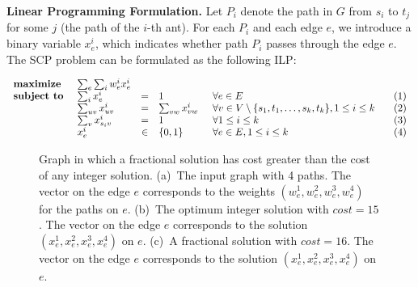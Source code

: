\documentclass[runningheads]{llncs}
\newcommand{\SCoP}{\textsc{SCP}}
\begin{document}
{\bf Linear Programming Formulation.}
Let $P_i$ denote the path in $G$ from $s_i$ to $t_j$ for some $j$ (the
path of the $i$-th ant).
For each $P_i$ and each edge $e$, we introduce a binary variable
$x_e^i$, which indicates whether
path $P_i$ passes through the edge $e$. The \SCoP{} problem can be
formulated as the following ILP:

$$
\begin{array}{llcllr}
\mbox{\textbf{maximize}}\:\: & \sum_e \sum_i w_e^i x_e^i \\
\mbox{\textbf{subject to }} & \sum_i x_e^i        &=&  1  & \forall
e\in E & \:\:\:\:(1)\\
& \sum_{uv} x_{uv}^i  &=&  \sum_{vw} x_{vw}^i \:\:& \forall v \in V \setminus \{s_1,t_1,\ldots, s_k,t_k\},
1\le i \le k & (2)\\
& \sum_{v} x_{s_iv}^i &=&  1 & \forall 1\le i \le k & (3) \\
& x_e^i & \in & \{0,1\} & \forall e\in E, 1\le i \le k & (4)
\end{array}
$$

\begin{figure}[t]
\center
\hfill
\hfill
    \caption{Graph in which a fractional solution has cost greater
    than the cost of any integer solution.
    (a)~The input graph with 4 paths. The vector on the edge $e$
    corresponds to the weights $(w_e^1, w_e^2, w_e^3, w_e^4)$ for the
    paths on $e$.
    (b)~The optimum integer solution with $cost=15$.
    The vector on the edge $e$ corresponds to the solution
    $(x_e^1,x_e^2, x_e^3, x_e^4)$ on $e$.
    (c)~A fractional solution with $cost=16$.
    The vector on the edge $e$ corresponds to the solution
    $(x_e^1,x_e^2, x_e^3, x_e^4)$ on $e$.}
    \label{fig:noninteger}
\end{figure}
\end{document}
